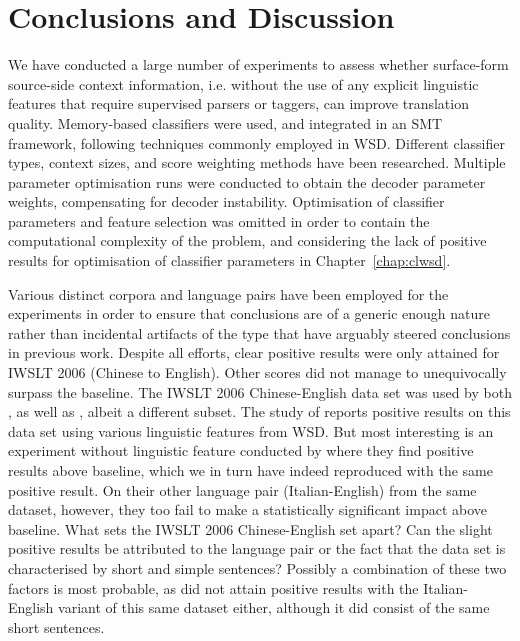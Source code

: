 \section{Conclusions and Discussion} 
\label{sec:conclusion}

We have conducted a large number of experiments to assess whether surface-form
source-side context information, i.e. without the use of any explicit
linguistic features that require supervised parsers or taggers, can improve
translation quality. Memory-based classifiers were used, and integrated in an
SMT framework, following techniques commonly employed in WSD. Different
classifier types, context sizes, and score weighting methods have been
researched. Multiple parameter optimisation runs were conducted to obtain the
decoder parameter weights, compensating for decoder instability. Optimisation
of classifier parameters and feature selection was omitted in order to contain
the computational complexity of the problem, and considering the lack of positive
results for optimisation of classifier parameters in Chapter~\ref{chap:clwsd}.

Various distinct corpora and language pairs have been employed for the
experiments in order to ensure that conclusions are of a generic enough nature
rather than incidental artifacts of the type that have arguably steered
conclusions in previous work. Despite all efforts, clear positive results were
only attained for IWSLT 2006 (Chinese to English). Other scores did not manage
to unequivocally surpass the baseline. The IWSLT 2006 Chinese-English data set
was used by both \cite{CarpuatWu07}, as well as \cite{Stroppa+07}, albeit a
different subset. The study of \cite{CarpuatWu07} reports positive results on
this data set using various linguistic features from WSD. But most interesting
is an experiment without linguistic feature conducted by \cite{Stroppa+07}
where they find positive results above baseline, which we in turn have indeed
reproduced with the same positive result. On their other language pair
(Italian-English) from the same dataset, however, they too fail to make a
statistically significant impact above baseline. What sets the IWSLT 2006
Chinese-English set apart? Can the slight positive results be attributed to the
language pair or the fact that the data set is characterised by short and
simple sentences? Possibly a combination of these two factors is most probable,
as \cite{Stroppa+07} did not attain positive results with the Italian-English
variant of this same dataset either, although it did consist of the same short
sentences.

